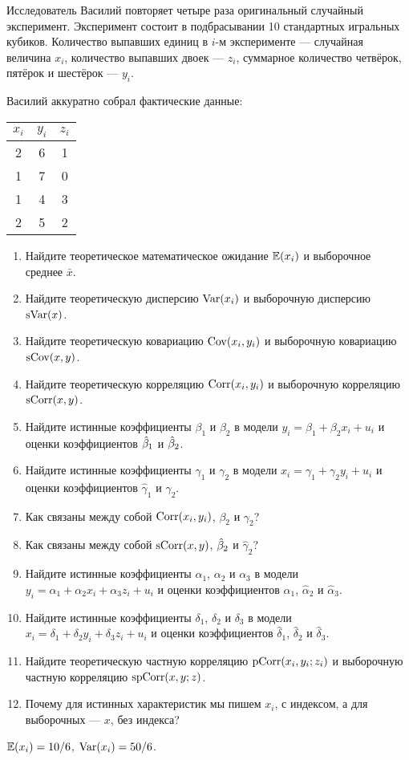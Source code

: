 \begin{problem}
Исследователь Василий повторяет четыре раза оригинальный случайный эксперимент.
Эксперимент состоит в подбрасывании 10 стандартных игральных кубиков.
Количество выпавших единиц в $i$-м эксперименте — случайная величина $x_i$,
количество выпавших двоек — $z_i$,
суммарное количество четвёрок, пятёрок и шестёрок — $y_i$.


Василий аккуратно собрал фактические данные:

\begin{tabular}{ccc}
\toprule
$x_i$ & $y_i$ & $z_i$ \\
\midrule
2 & 6 & 1 \\
1 & 7 & 0 \\
1 & 4 & 3 \\
2 & 5 & 2 \\
\bottomrule
\end{tabular}


\begin{enumerate}
\item Найдите теоретическое математическое ожидание $\mathbb{E}(x_i)$ и выборочное среднее $\bar x$.
\item Найдите теоретическую дисперсию $\operatorname{Var}(x_i)$ и выборочную дисперсию $\operatorname{sVar}(x)$.
\item Найдите теоретическую ковариацию $\operatorname{Cov}(x_i, y_i)$ и выборочную ковариацию $\operatorname{sCov}(x, y)$.
\item Найдите теоретическую корреляцию $\operatorname{Corr}(x_i, y_i)$ и выборочную корреляцию $\operatorname{sCorr}(x, y)$.
\item Найдите истинные коэффициенты $\beta_1$ и $\beta_2$ в модели $y_i = \beta_1 + \beta_2 x_i + u_i$ и оценки коэффициентов $\hat{\beta}_1$ и $\hat{\beta}_2$.
\item Найдите истинные коэффициенты $\gamma_1$ и $\gamma_2$ в модели $x_i = \gamma_1 + \gamma_2 y_i + u_i$ и оценки коэффициентов $\hat\gamma_1$ и $\hat\gamma_2$.
\item Как связаны между собой $\operatorname{Corr}(x_i, y_i)$, $\beta_2$ и $\gamma_2$?
\item Как связаны между собой $\operatorname{sCorr}(x, y)$, $\hat{\beta}_2$ и $\hat\gamma_2$?
\item Найдите истинные коэффициенты $\alpha_1$, $\alpha_2$ и $\alpha_3$ в модели $y_i = \alpha_1 + \alpha_2 x_i + \alpha_3 z_i +  u_i$ и оценки коэффициентов $\hat\alpha_1$, $\hat\alpha_2$ и $\hat\alpha_3$.
\item Найдите истинные коэффициенты $\delta_1$, $\delta_2$ и $\delta_3$ в модели $x_i = \delta_1 + \delta_2 y_i + \delta_3 z_i +  u_i$ и оценки коэффициентов $\hat\delta_1$, $\hat\delta_2$ и $\hat\delta_3$.
\item Найдите теоретическую частную корреляцию $\operatorname{pCorr}(x_i, y_i; z_i)$ и выборочную частную корреляцию $\operatorname{spCorr}(x, y; z)$.
\item Почему для истинных характеристик мы пишем $x_i$, с индексом, а для выборочных — $x$,
без индекса?
\end{enumerate}

\begin{sol}
$\mathbb{E}(x_i)=10/6$, $\operatorname{Var}(x_i)=50/6$.
\end{sol}
\end{problem}

